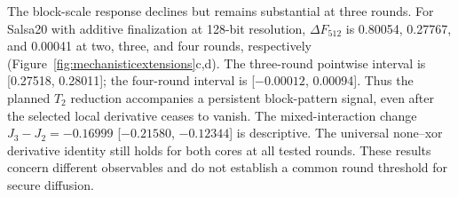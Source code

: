 The block-scale response declines but remains substantial at three rounds. For Salsa20 with additive finalization at 128-bit resolution, $\Delta F_{512}$ is 0.80054, 0.27767, and 0.00041 at two, three, and four rounds, respectively (Figure~\ref{fig:mechanisticextensions}c,d). The three-round pointwise interval is [0.27518, 0.28011]; the four-round interval is [$-0.00012$, 0.00094]. Thus the planned $T_2$ reduction accompanies a persistent block-pattern signal, even after the selected local derivative ceases to vanish. The mixed-interaction change $J_3-J_2=-0.16999$ [$-0.21580$, $-0.12344$] is descriptive. The universal none--xor derivative identity still holds for both cores at all tested rounds. These results concern different observables and do not establish a common round threshold for secure diffusion.
